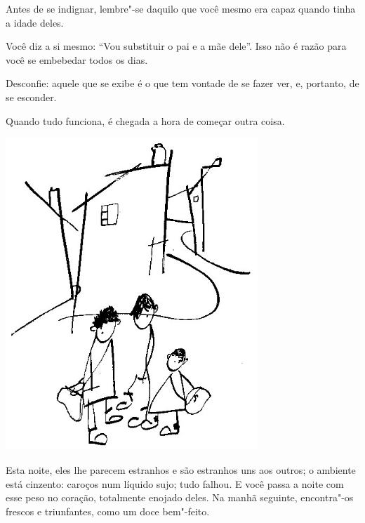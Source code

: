 \bigskip
\bigskip

Antes de se indignar, lembre"-se daquilo que você mesmo era capaz quando
tinha a idade deles.

\bigskip
\bigskip

Você diz a si mesmo: ``Vou substituir o pai e a mãe dele''. Isso não é
razão para você se embebedar todos os dias.

\bigskip
\bigskip

Desconfie: aquele que se exibe é o que tem vontade de se fazer ver, e,
portanto, de se esconder.

\bigskip
\bigskip

Quando tudo funciona, é chegada a hora de começar outra coisa.

\pagebreak
\thispagestyle{empty}

\begin{vplace}[.50]
\begin{center}
\includegraphics[width=95mm]{./imgs/Image_7.jpg}
\end{center}
\end{vplace}

\bigskip
\bigskip

\pagebreak

Esta noite, eles lhe parecem estranhos e são estranhos uns aos outros; o
ambiente está cinzento: caroços num líquido sujo; tudo falhou. E você
passa a noite com esse peso no coração, totalmente enojado deles. Na
manhã seguinte, encontra"-os frescos e triunfantes, como um doce
bem"-feito.

